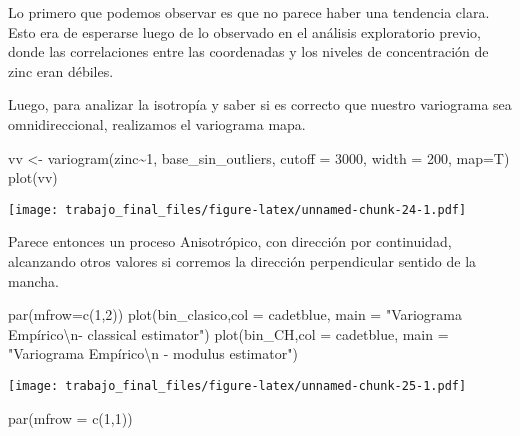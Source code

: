 \documentclass[
  12pt,
]{article}
\newenvironment{Shaded}{\begin{snugshade}}{\end{snugshade}}
\newcommand{\AttributeTok}[1]{\textcolor[rgb]{0.77,0.63,0.00}{#1}}
\newcommand{\DecValTok}[1]{\textcolor[rgb]{0.00,0.00,0.81}{#1}}
\newcommand{\FunctionTok}[1]{\textcolor[rgb]{0.00,0.00,0.00}{#1}}
\newcommand{\NormalTok}[1]{#1}
\newcommand{\OtherTok}[1]{\textcolor[rgb]{0.56,0.35,0.01}{#1}}
\newcommand{\SpecialCharTok}[1]{\textcolor[rgb]{0.00,0.00,0.00}{#1}}
\newcommand{\StringTok}[1]{\textcolor[rgb]{0.31,0.60,0.02}{#1}}
\begin{document}
Lo primero que podemos observar es que no parece haber una tendencia
clara. Esto era de esperarse luego de lo observado en el análisis
exploratorio previo, donde las correlaciones entre las coordenadas y los
niveles de concentración de zinc eran débiles.

Luego, para analizar la isotropía y saber si es correcto que nuestro
variograma sea omnidireccional, realizamos el variograma mapa.

\begin{Shaded}
\begin{Highlighting}[]
\NormalTok{vv }\OtherTok{\textless{}{-}} \FunctionTok{variogram}\NormalTok{(zinc}\SpecialCharTok{\textasciitilde{}}\DecValTok{1}\NormalTok{, base\_sin\_outliers, }\AttributeTok{cutoff =} \DecValTok{3000}\NormalTok{, }\AttributeTok{width =} \DecValTok{200}\NormalTok{, }\AttributeTok{map=}\NormalTok{T)}
\FunctionTok{plot}\NormalTok{(vv)}
\end{Highlighting}
\end{Shaded}

\texttt{[image: trabajo\_final\_files/figure-latex/unnamed-chunk-24-1.pdf]}

Parece entonces un proceso Anisotrópico, con dirección por continuidad,
alcanzando otros valores si corremos la dirección perpendicular sentido
de la mancha.

\begin{Shaded}
\begin{Highlighting}[]
\FunctionTok{par}\NormalTok{(}\AttributeTok{mfrow=}\FunctionTok{c}\NormalTok{(}\DecValTok{1}\NormalTok{,}\DecValTok{2}\NormalTok{))}
\FunctionTok{plot}\NormalTok{(bin\_clasico,}\AttributeTok{col =} \StringTok{\textquotesingle{}cadetblue\textquotesingle{}}\NormalTok{,  }\AttributeTok{main =} \StringTok{"Variograma Empírico}\SpecialCharTok{\textbackslash{}n}\StringTok{{-} classical estimator"}\NormalTok{)}
\FunctionTok{plot}\NormalTok{(bin\_CH,}\AttributeTok{col =} \StringTok{\textquotesingle{}cadetblue\textquotesingle{}}\NormalTok{,  }\AttributeTok{main =} \StringTok{"Variograma Empírico}\SpecialCharTok{\textbackslash{}n}\StringTok{ {-} modulus estimator"}\NormalTok{)}
\end{Highlighting}
\end{Shaded}

\texttt{[image: trabajo\_final\_files/figure-latex/unnamed-chunk-25-1.pdf]}

\begin{Shaded}
\begin{Highlighting}[]
\FunctionTok{par}\NormalTok{(}\AttributeTok{mfrow =} \FunctionTok{c}\NormalTok{(}\DecValTok{1}\NormalTok{,}\DecValTok{1}\NormalTok{))}
\end{Highlighting}
\end{Shaded}
\end{document}
